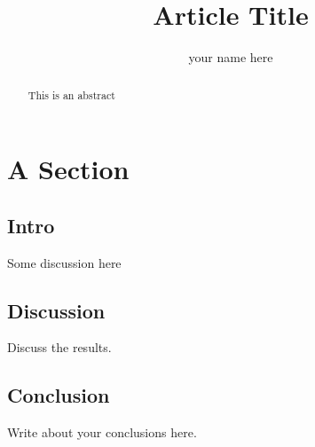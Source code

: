 \documentclass{article}
\begin{document}
\title{Article Title}
\author{your name here}

\maketitle


\begin{abstract}
	This is an abstract
\end{abstract}

\section{A Section}%

\subsection{Intro}%
\label{sec:a_section}

Some discussion here

\subsection{Discussion}%
\label{sub:another_subsection}
Discuss the results.


\subsection{Conclusion}%
\label{sub:conclusion}

Write about your conclusions here.

	
\end{document}
